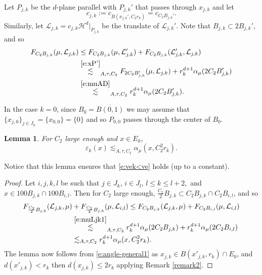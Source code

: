 \documentclass[11pt]{amsart}
\newcommand{\HH}{{\mathcal H}}
\newcommand{\LL}{{\mathcal L}}
\newcommand{\ve}{{\varepsilon}}
\newtheorem{lemma}[theorem]{Lemma}
\theoremstyle{definition}
\theoremstyle{remark}
\numberwithin{equation}{section}
\newcommand{\cnj}[1]{\overline{#1}}
\def\cH{{\mathcal{H}}}
\def\lec{\lesssim}
\def\lec{\lesssim}
\begin{document}
Let $P_{j,k}$ be the $d$-plane parallel with $P_{j,k}'$ that passes through $x_{j,k}$ and let
\[
c_{j,k} := c_{B(x_{j,k}',C_{2}r_{k})}=c_{C_{2}B_{j,k}'}.\] 
%
Similarly, let $\LL_{j,k}=c_{j,k} \HH^{d}|_{P_{j,k}}$ be the translate of $\LL_{j,k}'$. Note that $B_{j,k}\subset 2B_{j,k}'$, and so 
\begin{align}
F_{C_{2}B_{j,k}}(\mu, \LL_{j,k})
& \leq F_{C_{2}B_{j,k}}(\mu, \LL_{j,k}')
+F_{C_{2}B_{j,k}}(\LL_{j,k}', \LL_{j,k}) \notag \\
& \stackrel{\eqref{e:xP'}}{\lec}_{A,\tau,C_2} F_{2C_{2}B_{j,k}'}(\mu, \LL_{j,k}) +  r_{k}^{d+1}\alpha_{\mu}(2C_{2}B_{j,k}') \notag \\
& \stackrel{\eqref{e:muAD}}{\lec}_{A,\tau,C_2}  r_{k}^{d+1}\alpha_{\mu}(2C_{2}B_{j,k}') .
\label{e:muLjk1}
\end{align}

In the case $k=0$, since $B_{0}=\cnj{B(0,1)}$  we may assume that $\{x_{j,0}\}_{j\in J_0}= \{x_{0,0}\}=\{0\}$ and so $P_{0,0}$ passes through the center of $B_0$. 


\begin{lemma}
For $C_{2}$ large enough and $x\in E_k$,
	\begin{equation}\label{e:ve<a}
	\ve_{k}(x) \lec_{A,\tau, C_2} \alpha_{\mu}(x,C_{2}^2 r_{k}).
	\end{equation}
\end{lemma}

Notice that this lemma ensures that \eqref{e:vek<ve} holds (up to a constant). 

\begin{proof}
Let $i,j,k,l$ be such that  $j\in J_{k}$,  $i\in J_{l}$, $l\leq k\leq l+2,$
and $x\in 100 B_{j,k}\cap 100 B_{i,l}$. Then for $C_{2}$ large enough, $\frac{C_{2}}{2} B_{j,k}\subset C_{2} B_{j,k}\cap C_{2} B_{i,l}$, and so 
\begin{align*}
F_{\frac{C_2}{2} B_{j,k}}(\LL_{j,k},\mu)  & +F_{\frac{C_{2}}{2} B_{j,k}}(\mu,\LL_{i,l})
 \leq F_{C_{2}B_{j,k}}(\LL_{j,k},\mu) +F_{C_{2}B_{i,l}}(\mu,\LL_{i,l})\\
& \stackrel{\eqref{e:muLjk1}}{\lec}_{A,\tau,C_2}   r_{k}^{d+1}\alpha_{\mu}(2C_{2}B_{j,k})+ r_{k}^{d+1}\alpha_{\mu}(2C_{2}B_{i,l})\\ &\lec_{A,\tau,C_2} r_{k}^{d+1}\alpha_{\mu}(x,C_{2}^2 r_{k}).
\end{align*}
The lemma now follows from \eqref{e:angle-general1} as $x_{j,k}\in B(x'_{j,k}, r_k)\cap E_0$, and $d(x'_{j,k})<r_k$ then $d(x_{j,k})\le 2r_k$ applying Remark \ref{remark2}.
\end{proof}
	
\end{document}
